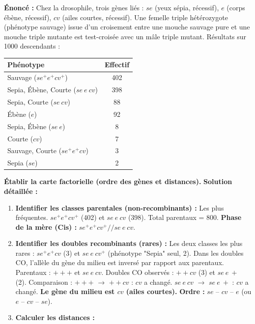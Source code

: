 \documentclass[11pt]{article}
\begin{document}
\begin{exoresolu}
    \textbf{Énoncé :} Chez la drosophile, trois gènes liés : $se$ (yeux sépia, récessif), $e$ (corps ébène, récessif), $cv$ (ailes courtes, récessif). Une femelle triple hétérozygote (phénotype sauvage) issue d'un croisement entre une mouche sauvage pure et une mouche triple mutante est test-croisée avec un mâle triple mutant. Résultats sur 1000 descendants :
    \begin{center}
    \begin{tabular}{|l|c|}\hline Phénotype & Effectif \\ \hline
    Sauvage ($se^+ e^+ cv^+$) & 402 \\ \hline
    Sepia, Ébène, Courte ($se\ e\ cv$) & 398 \\ \hline
    Sepia, Courte ($se\ cv$) & 88 \\ \hline
    Ébène ($e$) & 92 \\ \hline
    Sepia, Ébène ($se\ e$) & 8 \\ \hline
    Courte ($cv$) & 7 \\ \hline
    Sauvage, Courte ($se^+ e^+ cv$) & 3 \\ \hline
    Sepia ($se$) & 2 \\ \hline
    \end{tabular}
    \end{center}
    \textbf{Établir la carte factorielle (ordre des gènes et distances).}
    \tcblower
    \textbf{Solution détaillée :}
    \begin{enumerate}
        \item \textbf{Identifier les classes parentales (non-recombinants) :} Les plus fréquentes.
        $se^+ e^+ cv^+$ (402) et $se\ e\ cv$ (398). Total parentaux = 800.
        \textbf{Phase de la mère (Cis) :} $se^+ e^+ cv^+ // se\ e\ cv$.
        \item \textbf{Identifier les doubles recombinants (rares) :} Les deux classes les plus rares : $se^+ e^+ cv$ (3) et $se\ e\ cv^+$ (phénotype "Sepia" seul, 2).
        Dans les doubles CO, l'allèle du gène du milieu est inversé par rapport aux parentaux.
        Parentaux : $+ + +$ et $se\ e\ cv$.
        Doubles CO observés : $+ + cv$ (3) et $se\ e\ +$ (2).
        Comparaison : $+ + +$ $\to$ $+ + cv$ : $cv$ a changé. $se\ e\ cv$ $\to$ $se\ e\ +$ : $cv$ a changé.
        \textbf{Le gène du milieu est $cv$ (ailes courtes).}
        \textbf{Ordre :} $se$ -- $cv$ -- $e$ (ou $e$ -- $cv$ -- $se$).
        \item \textbf{Calculer les distances :}

\end{enumerate}
\end{exoresolu}
\end{document}

